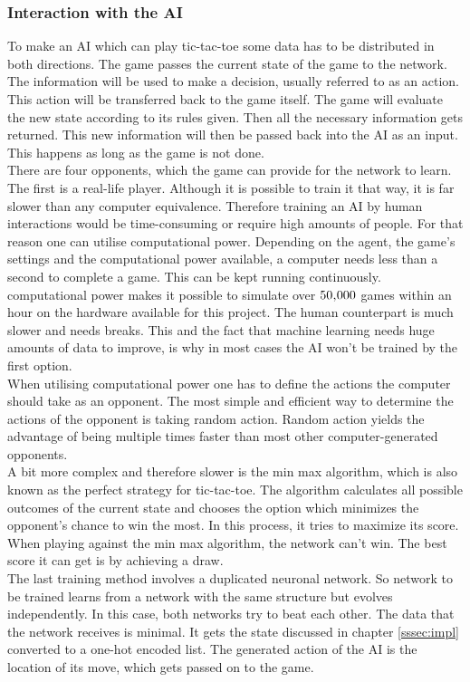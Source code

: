 \documentclass[12pt]{article}
\begin{document}
\subsubsection{Interaction with the AI}
To make an \gls{AI} which can play tic-tac-toe some data has to be distributed in both directions. The game passes the current \gls{state} of the game to the network. The information will be used to make a decision, usually referred to as an action. This action will be transferred back to the game itself. The game will evaluate the new \gls{state} according to its rules given. Then all the necessary information gets returned. This new information will then be passed back into the \gls{AI} as an input. This happens as long as the game is not done. \\
There are four opponents, which the game can provide for the network to learn. The first is a real-life player. Although it is possible to train it that way, it is far slower than any computer equivalence. Therefore training an AI by human interactions would be time-consuming or require high amounts of people. For that reason one can utilise \gls{computational power}. Depending on the agent, the game's settings and the \gls{computational power} available, a computer needs less than a second to complete a game. This can be kept running continuously. \Gls{computational power} makes it possible to simulate over $50\textsc{\char13}000$ games within an hour on the hardware available for this project. The human counterpart is much slower and needs breaks. This and the fact that \gls{machine learning} needs huge amounts of data to improve, is why in most cases the \gls{AI} won't be trained by the first option. \\
When utilising \gls{computational power} one has to define the actions the computer should take as an opponent. The most simple and efficient way to determine the actions of the opponent is taking random action. Random action yields the advantage of being multiple times faster than most other computer-generated opponents. \\
A bit more complex and therefore slower is the \gls{min max algorithm}, which is also known as the perfect strategy for tic-tac-toe. The algorithm calculates all possible outcomes of the current \gls{state} and chooses the option which minimizes the opponent's chance to win the most. In this process, it tries to maximize its score. When playing against the \gls{min max algorithm}, the network can't win. The best score it can get is by achieving a draw. \\
The last training method involves a duplicated \gls{neuronal network}. So network to be trained learns from a network with the same structure but evolves independently. In this case, both networks try to beat each other. The data that the network receives is minimal. It gets the \gls{state} discussed in chapter \ref{sssec:impl} converted to a one-hot encoded list. The generated action of the \gls{AI} is the location of its move, which gets passed on to the game.
\end{document}

